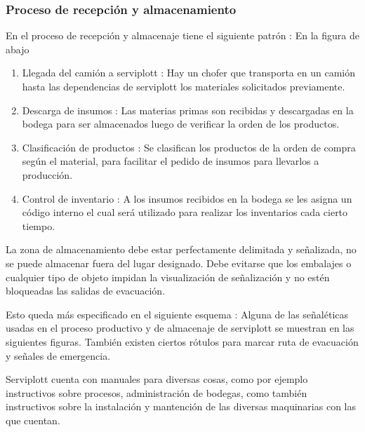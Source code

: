 \subsubsection{Proceso de recepción y almacenamiento}
	En el proceso de recepción y almacenaje tiene el siguiente patrón :
	En la figura de abajo 
	\begin{enumerate}[1)]
	\item Llegada del camión a serviplott : Hay un chofer que transporta en un camión hasta las dependencias de serviplott los materiales solicitados previamente. 
    \item Descarga de insumos : Las materias primas son recibidas y descargadas en la bodega para ser almacenados luego de verificar la orden de los productos.
    \item Clasificación de productos : Se clasifican los productos de la orden de compra según el material, para facilitar el pedido de insumos para llevarlos a producción.
    \item Control de inventario : A los insumos recibidos en la bodega se les asigna un código interno el cual será utilizado para realizar los inventarios cada cierto tiempo.
    \end{enumerate}
		La zona de almacenamiento debe estar perfectamente delimitada y señalizada, no se puede almacenar fuera del lugar designado. Debe evitarse que los embalajes o cualquier tipo de objeto impidan la visualización de señalización y no estén bloqueadas las salidas de evacuación.
 
 
	Esto queda más especificado en el siguiente esquema : 
	\newpage
		 Alguna de las señaléticas usadas en el proceso productivo y de almacenaje de serviplott se muestran en las siguientes figuras.
		 También existen ciertos rótulos para marcar ruta de evacuación y señales de emergencia.
		
		Serviplott cuenta con manuales para diversas cosas, como por ejemplo instructivos sobre procesos, administración de bodegas, como también instructivos sobre la instalación y mantención de las diversas maquinarias con las que cuentan. 		 		

